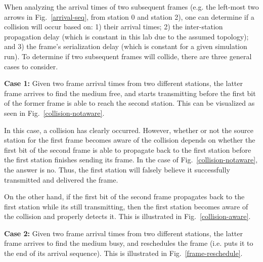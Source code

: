 \documentclass[11pt]{article}
\begin{document}

When analyzing the arrival times of two subsequent frames (e.g. the left-most two arrows in Fig.~\ref{arrival-seq}, from station 0 and station 2), one can determine if a collision will occur based on: 1) their arrival times; 2) the inter-station propagation delay (which is constant in this lab due to the assumed topology); and 3) the frame's serialization delay (which is constant for a given simulation run).
To determine if two subsequent frames will collide, there are three general cases to consider.


\textbf{Case 1:} Given two frame arrival times from two different stations, the latter frame arrives to find the medium free, and starts transmitting before the first bit of the former frame is able to reach the second station.
This can be visualized as seen in Fig.~\ref{collision-notaware}.


In this case, a collision has clearly occurred.
However, whether or not the source station for the first frame becomes aware of the collision depends on whether the first bit of the second frame is able to propagate back to the first station before the first station finishes sending its frame.
In the case of Fig.~\ref{collision-notaware}, the answer is no. Thus, the first station will falsely believe it successfully transmitted and delivered the frame.

On the other hand, if the first bit of the second frame propagates back to the first station while its still transmitting, then the first station becomes aware of the collision and properly detects it.
This is illustrated in Fig.~\ref{collision-aware}.


\textbf{Case 2:} Given two frame arrival times from two different stations, the latter frame arrives to find the medium busy, and reschedules the frame (i.e. puts it to the end of its arrival sequence).
This is illustrated in Fig.~\ref{frame-reschedule}.

\end{document}
